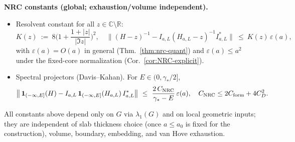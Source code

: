 \documentclass[11pt]{amsart}
\theoremstyle{plain}
\theoremstyle{definition}
\theoremstyle{remark}
\begin{document}
\begin{mdframed}[linewidth=0.5pt, linecolor=blue!40, backgroundcolor=blue!5, roundcorner=2pt, innertopmargin=8pt, innerbottommargin=8pt, skipabove=8pt, skipbelow=10pt]
\noindent\textbf{NRC constants (global; exhaustion/volume independent).}
\begin{itemize}
  \item Resolvent constant for all $z\in\mathbb C\setminus\mathbb R$:
  \[
    K(z)\ :=\ 8\Big(1+\frac{1+|z|}{|\Im z|}\Big)^{\!2},\quad \big\|(H-z)^{-1} - I_{a,L}(H_{a,L}-z)^{-1} I_{a,L}^*\big\|\ \le\ K(z)\,\varepsilon(a),
  \]
  with $\varepsilon(a)=O(a)$ in general (Thm.~\ref{thm:nrc-quant}) and $\varepsilon(a)\le a^2$ under the fixed-core normalization (Cor.~\ref{cor:NRC-explicit}).
  \item Spectral projectors (Davis–Kahan). For $E\in(0,\gamma_*/2]$,
  \[
    \big\|\,\mathbf 1_{(-\infty,E]}(H) - I_{a,L}\,\mathbf 1_{(-\infty,E]}(H_{a,L})\,I_{a,L}^*\big\|\ \le\ \frac{2\,C_{\mathrm{NRC}}}{\gamma_* - E}\,\varepsilon(a),\quad C_{\mathrm{NRC}}\le 2 C_{\rm form}+4 C_D^2.
  \]
\end{itemize}
All constants above depend only on $G$ via $\lambda_1(G)$ and on local geometric inputs; they are independent of slab thickness choice (once $a\le a_0$ is fixed for the construction), volume, boundary, embedding, and van Hove exhaustion.
\end{mdframed}

\medskip
\end{document}
